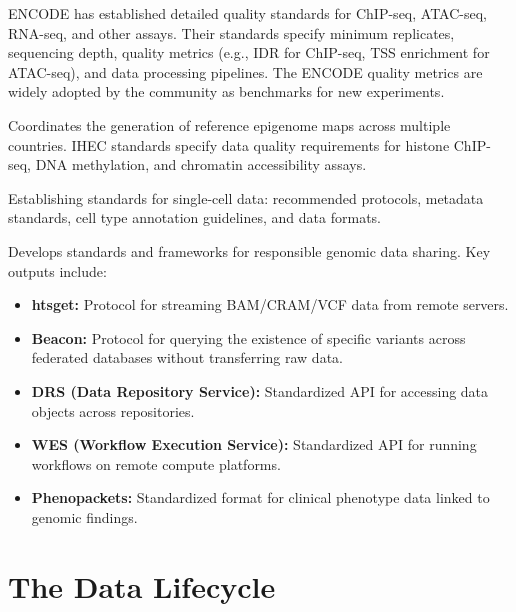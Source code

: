 \begin{description}[style=nextline, font=\bfseries, itemsep=3pt]
  \item[ENCODE Consortium]
  ENCODE has established detailed quality standards for ChIP-seq, ATAC-seq, RNA-seq, and other assays. Their standards specify minimum replicates, sequencing depth, quality metrics (e.g., IDR for ChIP-seq, TSS enrichment for ATAC-seq), and data processing pipelines. The ENCODE quality metrics are widely adopted by the community as benchmarks for new experiments.

  \item[IHEC (International Human Epigenome Consortium)]
  Coordinates the generation of reference epigenome maps across multiple countries. IHEC standards specify data quality requirements for histone ChIP-seq, DNA methylation, and chromatin accessibility assays.

  \item[Human Cell Atlas (HCA)]
  Establishing standards for single-cell data: recommended protocols, metadata standards, cell type annotation guidelines, and data formats.

  \item[GA4GH (Global Alliance for Genomics and Health)]
  Develops standards and frameworks for responsible genomic data sharing. Key outputs include:
  \begin{itemize}[nosep]
    \item \textbf{htsget:} Protocol for streaming BAM/CRAM/VCF data from remote servers.
    \item \textbf{Beacon:} Protocol for querying the existence of specific variants across federated databases without transferring raw data.
    \item \textbf{DRS (Data Repository Service):} Standardized API for accessing data objects across repositories.
    \item \textbf{WES (Workflow Execution Service):} Standardized API for running workflows on remote compute platforms.
    \item \textbf{Phenopackets:} Standardized format for clinical phenotype data linked to genomic findings.
  \end{itemize}
\end{description}

\section{The Data Lifecycle}
\label{sec:datastandards:lifecycle}

